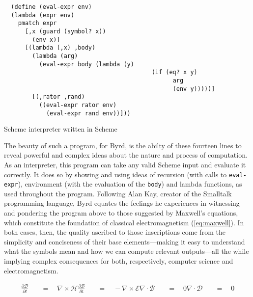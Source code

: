 \begin{listing}
  \begin{verbatim}
  (define (eval-expr env)
  (lambda (expr env)
    pmatch expr
      [,x (guard (symbol? x))
        (env x)]
      [(lambda (,x) ,body)
        (lambda (arg)
          (eval-expr body (lambda (y)
                                          (if (eq? x y)
                                                arg
                                                (env y)))))]
        [(,rator ,rand)
          ((eval-expr rator env)
            (eval-expr rand env))]))
\end{verbatim}
  \caption{Scheme interpreter written in Scheme}
  \label{code:scheme_interpreter}
\end{listing}


The beauty of such a program, for Byrd, is the abilty of these fourteen lines to reveal powerful and complex ideas about the nature and process of computation. As an interpreter, this program can take any valid Scheme input and evaluate it correctly. It does so by showing and using ideas of recursion (with calls to \lstinline{eval-expr}), environment (with the evaluation of the \lstinline{body}) and lambda functions, as used throughout the program. Following Alan Kay, creator of the Smalltalk programming language, Byrd equates the feelings he experiences in witnessing and pondering the program above to those suggested by Maxwell's equations, which constitute the foundation of classical electromagnetism (\eqref{eq:maxwell})\cite{kay_conversation_2004}. In both cases, then, the quality ascribed to those inscriptions come from the simplicity and conciseness of their base elements—making it easy to understand what the symbols mean and how we can compute relevant outputs—all the while implying complex consequences for both, respectively, computer science and electromagnetism.

\begin{equation}
  \label{eq:maxwell}
  \begin{aligned}
    \frac{\partial\mathcal{D}}{\partial t} \quad & = \quad \nabla\times\mathcal{H}
    \frac{\partial\mathcal{B}}{\partial t} \quad & = \quad -\nabla\times\mathcal{E}
    \nabla\cdot\mathcal{B}                 \quad & = \quad 0
    \nabla\cdot\mathcal{D}                 \quad & = \quad 0
  \end{aligned}
\end{equation}

